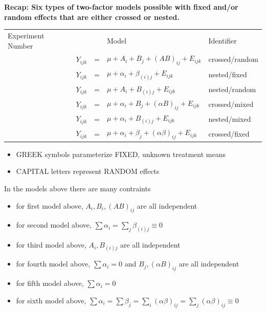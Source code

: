 \textbf{Recap:  Six types of two-factor models possible with fixed and/or random effects that are either crossed or nested.}
\begin{center}
\begin{tabular}{l|ccl|l}
Experiment Number & && Model & Identifier\\
\underbar{~~~~~} & $Y_{ijk}$&=&$\mu + A_i + B_j + (AB)_{ij} + E_{ijk}$  & \mbox{crossed/random} \\
\underbar{~~~~~} & $Y_{ijk}$&=&$\mu + \alpha_i + \beta_{(i)j} + E_{ijk}$ &  \mbox{nested/fixed} \\
\underbar{~~~~~} & $Y_{ijk}$&=&$\mu + A_i + B_{(i)j} + E_{ijk}$  & \mbox{nested/random} \\
\underbar{~~~~~} & $Y_{ijk}$&=&$\mu + \alpha_i + B_j + (\alpha B)_{ij} + E_{ijk}$  & \mbox{crossed/mixed} \\
\underbar{~~~~~} & $Y_{ijk}$&=&$\mu + \alpha_i + B_{(i)j} + E_{ijk}$  & \mbox{nested/mixed} \\
\underbar{~~~~~} & $Y_{ijk}$&=&$\mu + \alpha_i + \beta_j + (\alpha\beta)_{ij} + E_{ijk}$ & \mbox{crossed/fixed} \\
\end{tabular}
\end{center}

\begin{itemize}
\item GREEK symbols parameterize FIXED, unknown treatment means 
\item CAPITAL letters represent RANDOM effects
\end{itemize}
In the models above there are many contraints
\begin{itemize}
\item for first model above, $A_i,B_i,(AB)_{ij}$ are all independent
\item for second model above, $\sum \alpha_i = \sum_j \beta_{(i)j} \equiv  0$
\item for third model above, $A_i,B_{(i)j}$ are all independent
\item for fourth model above, $\sum \alpha_i=0$ and $B_j,(\alpha B)_{ij}$ are all independent
\item for fifth model above, $\sum \alpha_i=0$ 
\item for sixth model above, $\sum \alpha_i = \sum \beta_j = \sum_i (\alpha\beta)_{ij} = \sum_j (\alpha\beta)_{ij} \equiv 0$
\end{itemize}

\newpage

